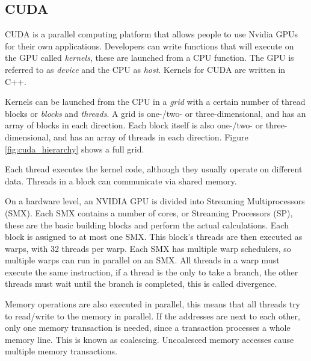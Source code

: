 \documentclass[../main/thesis.tex]{subfiles}
\begin{document}


\subsection{CUDA}
CUDA is a parallel computing platform that allows people to use Nvidia GPUs for their own applications.
Developers can write functions that will execute on the GPU called \textit{kernels}, these are launched from a CPU function.
The GPU is referred to as \textit{device} and the CPU as \textit{host}.
Kernels for CUDA are written in C++.

Kernels can be launched from the CPU in a \textit{grid} with a certain number of thread blocks or \textit{blocks} and \textit{threads}.
A grid is one-/two- or three-dimensional, and has an array of blocks in each direction.
Each block itself is also one-/two- or three-dimensional, and has an array of threads in each direction.
Figure \ref{fig:cuda_hierarchy} shows a full grid.


Each thread executes the kernel code, although they usually operate on different data.
Threads in a block can communicate via shared memory.

On a hardware level, an NVIDIA GPU is divided into Streaming Multiprocessors (SMX).
Each SMX contains a number of cores, or Streaming Processors (SP), these are the basic building blocks and perform the actual calculations.
Each block is assigned to at most one SMX.
This block's threads are then executed as warps, with 32 threads per warp.
Each SMX has multiple warp schedulers, so multiple warps can run in parallel on an SMX.
All threads in a warp must execute the same instruction, if a thread is the only to take a branch, the other threads must wait until the branch is completed, this is called divergence.

Memory operations are also executed in parallel, this means that all threads try to read/write to the memory in parallel.
If the addresses are next to each other, only one memory transaction is needed, since a transaction processes a whole memory line.
This is known as coalescing.
Uncoalesced memory accesses cause multiple memory transactions.
\end{document}

